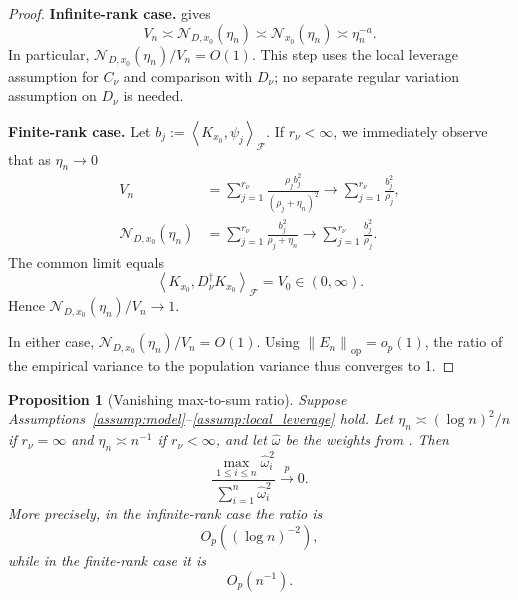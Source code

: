 \documentclass[11pt]{article}
\newtheorem{proposition}{Proposition}[section]
\newcommand{\F}{\mathcal{F}}
\newcommand{\Ncal}{\mathcal{N}}
\newcommand{\op}{\mathrm{op}}
\newcommand{\inner}[2]{\left\langle #1,#2\right\rangle}
\newcommand{\norm}[1]{\left\lVert #1\right\rVert}
\begin{document}
\begin{proof}
\medskip
\noindent\textbf{Infinite-rank case.}
 gives
\[
 V_n\asymp\Ncal_{D,x_0}(\eta_n)\asymp\Ncal_{x_0}(\eta_n)\asymp\eta_n^{-a}.
\]
In particular, $\Ncal_{D,x_0}(\eta_n)/V_n=O(1)$. This step uses the local leverage assumption for $C_\nu$ and comparison with $D_\nu$; no separate regular variation assumption on $D_\nu$ is needed.

\medskip
\noindent\textbf{Finite-rank case.}
Let $b_j:=\inner{K_{x_0}}{\psi_j}_{\F}$. If $r_\nu<\infty$, we immediately observe that as $\eta_n \to 0$
\begin{align*}
V_n
&=
\sum_{j=1}^{r_\nu}
\frac{\rho_j b_j^2}{(\rho_j+\eta_n)^2}
\longrightarrow
\sum_{j=1}^{r_\nu}\frac{b_j^2}{\rho_j},\\
\Ncal_{D,x_0}(\eta_n)
&=
\sum_{j=1}^{r_\nu}\frac{b_j^2}{\rho_j+\eta_n}
\longrightarrow
\sum_{j=1}^{r_\nu}\frac{b_j^2}{\rho_j}.
\end{align*}
The common limit equals
\[
  \inner{K_{x_0}}{D_\nu^\dagger K_{x_0}}_{\F}
  =V_0\in(0,\infty).
\]
Hence $\Ncal_{D,x_0}(\eta_n)/V_n\to1$.

In either case, $\Ncal_{D,x_0}(\eta_n)/V_n=O(1)$. Using $\norm{E_n}_{\op}=o_p(1)$, the ratio of the empirical variance to the population variance thus converges to 1.

\end{proof}

\begin{proposition}[Vanishing max-to-sum ratio]\label{prop:max_sum}
Suppose Assumptions~\ref{assump:model}--\ref{assump:local_leverage} hold. Let $\eta_n\asymp (\log n)^2/n$ if $r_\nu=\infty$ and $\eta_n\asymp n^{-1}$ if $r_\nu<\infty$, and let $\widehat\omega$ be the weights from . Then
\begin{equation}
  \frac{\max_{1\le i\le n}\widehat\omega_i^2}
  {\sum_{i=1}^n\widehat\omega_i^2}
  \overset p\longrightarrow0.
  \label{eq:max_sum}
\end{equation}
More precisely, in the infinite-rank case the ratio is
\[
  O_p\!\left((\log n)^{-2}\right),
\]
while in the finite-rank case it is
\[
  O_p(n^{-1}).
\]
\end{proposition}
\end{document}
